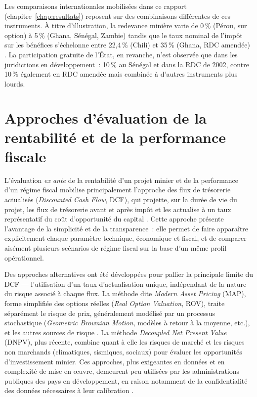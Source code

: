 Les comparaisons internationales mobilisées dans ce rapport (chapitre~\ref{chap:resultats}) reposent sur des combinaisons différentes de ces instruments. À titre d'illustration, la redevance minière varie de 0\,\% (Pérou, sur option) à 5\,\% (Ghana, Sénégal, Zambie) tandis que le taux nominal de l'impôt sur les bénéfices s'échelonne entre 22,4\,\% (Chili) et 35\,\% (Ghana, RDC amendée) \citep{pwc2012,laporte2016or}. La participation gratuite de l'État, en revanche, n'est observée que dans les juridictions en développement~: 10\,\% au Sénégal et dans la RDC de 2002, contre 10\,\% également en RDC amendée mais combinée à d'autres instruments plus lourds.

\section{Approches d'évaluation de la rentabilité et de la performance fiscale}

L'évaluation \emph{ex ante} de la rentabilité d'un projet minier et de la performance d'un régime fiscal mobilise principalement l'approche des flux de trésorerie actualisés (\emph{Discounted Cash Flow}, DCF), qui projette, sur la durée de vie du projet, les flux de trésorerie avant et après impôt et les actualise à un taux représentatif du coût d'opportunité du capital \citep{otto2006royalties}. Cette approche présente l'avantage de la simplicité et de la transparence~: elle permet de faire apparaître explicitement chaque paramètre technique, économique et fiscal, et de comparer aisément plusieurs scénarios de régime fiscal sur la base d'un même profil opérationnel.

Des approches alternatives ont été développées pour pallier la principale limite du DCF --- l'utilisation d'un taux d'actualisation unique, indépendant de la nature du risque associé à chaque flux. La méthode dite \emph{Modern Asset Pricing} (MAP), forme simplifiée des options réelles (\emph{Real Option Valuation}, ROV), traite séparément le risque de prix, généralement modélisé par un processus stochastique (\emph{Geometric Brownian Motion}, modèles à retour à la moyenne, etc.), et les autres sources de risque \citep{guj2012royalties}. La méthode \emph{Decoupled Net Present Value} (DNPV), plus récente, combine quant à elle les risques de marché et les risques non marchands (climatiques, sismiques, sociaux) pour évaluer les opportunités d'investissement minier. Ces approches, plus exigeantes en données et en complexité de mise en \oe uvre, demeurent peu utilisées par les administrations publiques des pays en développement, en raison notamment de la confidentialité des données nécessaires à leur calibration \citep{kourouma2019}.

